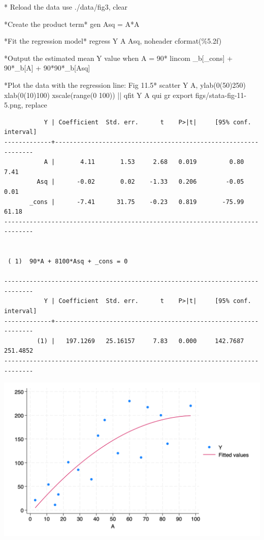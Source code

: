 \documentclass[
  10pt,
  a4paper,
]{book}
\newenvironment{Shaded}{\begin{snugshade}}{\end{snugshade}}
\newcommand{\BaseNTok}[1]{\textcolor[rgb]{0.68,0.00,0.00}{#1}}
\newcommand{\DataTypeTok}[1]{\textcolor[rgb]{0.68,0.00,0.00}{#1}}
\newcommand{\KeywordTok}[1]{\textcolor[rgb]{0.00,0.46,0.62}{#1}}
\newcommand{\NormalTok}[1]{\textcolor[rgb]{0.00,0.46,0.62}{#1}}
\newcommand{\OtherTok}[1]{\textcolor[rgb]{0.00,0.46,0.62}{#1}}
\begin{document}
\begin{Shaded}
\begin{Highlighting}[]
\NormalTok{* Reload the }\KeywordTok{data}
\KeywordTok{use}\NormalTok{ ./}\KeywordTok{data}\NormalTok{/fig3, }\KeywordTok{clear}

\NormalTok{*Create the product term*}
\KeywordTok{gen}\NormalTok{ Asq = A*A}

\NormalTok{*Fit the regression }\KeywordTok{model}\NormalTok{*}
\KeywordTok{regress}\NormalTok{ Y A Asq, }\KeywordTok{noheader}\NormalTok{ cformat(\%5.2f)}

\NormalTok{*Output the estimated }\KeywordTok{mean}\NormalTok{ Y }\OtherTok{value}\NormalTok{ when A = 90*}
\KeywordTok{lincom}\NormalTok{ \_b[}\DataTypeTok{\_cons}\NormalTok{] + 90*\_b[A] + 90*90*\_b[Asq]}

\NormalTok{*Plot the }\KeywordTok{data}\NormalTok{ with the regression }\KeywordTok{line}\NormalTok{: Fig 11.5*}
\KeywordTok{scatter}\NormalTok{ Y A, ylab(0(50)250) xlab(0(10)100) }\BaseNTok{xscale}\NormalTok{(}\KeywordTok{range}\NormalTok{(0 100)) || qfit Y A}
\KeywordTok{qui} \KeywordTok{gr} \KeywordTok{export}\NormalTok{ figs/stata{-}fig{-}11{-}5.png, }\KeywordTok{replace}
\end{Highlighting}
\end{Shaded}

\begin{verbatim}
           Y | Coefficient  Std. err.      t    P>|t|     [95% conf. interval]
-------------+----------------------------------------------------------------
           A |       4.11       1.53     2.68   0.019         0.80        7.41
         Asq |      -0.02       0.02    -1.33   0.206        -0.05        0.01
       _cons |      -7.41      31.75    -0.23   0.819       -75.99       61.18
------------------------------------------------------------------------------


 ( 1)  90*A + 8100*Asq + _cons = 0

------------------------------------------------------------------------------
           Y | Coefficient  Std. err.      t    P>|t|     [95% conf. interval]
-------------+----------------------------------------------------------------
         (1) |   197.1269   25.16157     7.83   0.000     142.7687    251.4852
------------------------------------------------------------------------------
\end{verbatim}

\begin{center}\includegraphics[width=0.85\linewidth]{figs/stata-fig-11-5} \end{center}
\end{document}

